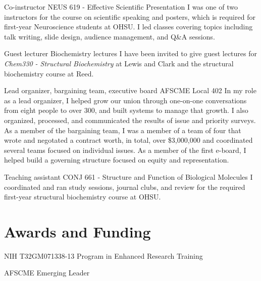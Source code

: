 \documentclass{prometheus_cv}
\begin{document}
\vspace{-1em}
{Co-instructor}
{NEUS 619 - Effective Scientific Presentation}
{%
	I was one of two instructors for the course on scientific speaking and posters, which is required for first-year Neuroscience students at OHSU.
	I led classes covering topics including talk writing, slide design, audience management, and Q\&A sessions.}

\vspace{-1em}
{Guest lecturer}
{Biochemistry lectures}
{%
	I have been invited to give guest lectures for \textit{Chem330 - Structural Biochemistry} at Lewis and Clark and the structural biochemistry course at Reed.}

\vspace{-1em}
{Lead organizer, bargaining team, executive board}
{AFSCME Local 402}
{%
	In my role as a lead organizer, I helped grow our union through one-on-one conversations from eight people to over 300, and built systems to manage that growth. I also organized, processed, and communicated the results of issue and priority surveys. As a member of the bargaining team, I was a member of a team of four that wrote and negotated a contract worth, in total, over \$3,000,000 and coordinated several teams focused on individual issues. As a member of the first e-board, I helped build a governing structure focused on equity and representation.}

\vspace{-1em}
{Teaching assistant}
{CONJ 661 - Structure and Function of Biological Molecules}
{%
	I coordinated and ran study sessions, journal clubs, and review for the required first-year structural biochemistry course at OHSU.}

\section{Awards and Funding}
{%
	NIH T32GM071338-13}
{%
	Program in Enhanced Research Training}
{}

{%
	AFSCME}
{%
	Emerging Leader}
{}
\end{document}
